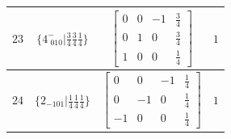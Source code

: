 \documentclass[fleqn,8pt]{jsarticle}
\begin{document}
\begin{longtable}{cccc}
$ 23 $ & $ \{4^{-}_{\,\,010}|\frac{3}{4} \frac{3}{4} \frac{1}{4}\} $ & $ \begin{bmatrix} 0 & 0 & -1 & \frac{3}{4} \\ 0 & 1 & 0 & \frac{3}{4} \\ 1 & 0 & 0 & \frac{1}{4} \end{bmatrix} $ & $ 1 $ \\ \hline
$ 24 $ & $ \{2{}_{-101}|\frac{1}{4} \frac{1}{4} \frac{1}{4}\} $ & $ \begin{bmatrix} 0 & 0 & -1 & \frac{1}{4} \\ 0 & -1 & 0 & \frac{1}{4} \\ -1 & 0 & 0 & \frac{1}{4} \end{bmatrix} $ & $ 1 $ \\
\end{longtable}
\end{document}
